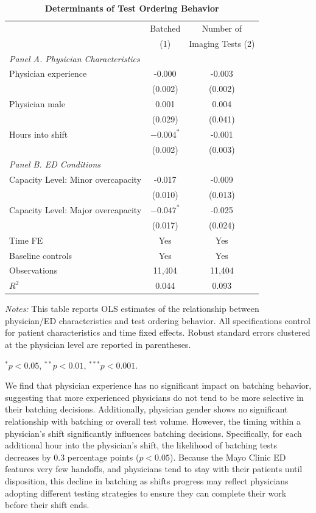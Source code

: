 \documentclass[,,nonblindrev]{informs}
\begin{document}
\begin{table}[t]
\centering
\caption{\textbf{Determinants of Test Ordering Behavior}}
\label{tab:determinants}
\begin{threeparttable}
\begin{tabular}{p{8cm}cc}
\toprule
& Batched & Number of \\
& (1) & Imaging Tests (2) \\
\midrule
\multicolumn{3}{l}{\textit{Panel A. Physician Characteristics}} \\[0.5em]
Physician experience & -0.000 & -0.003 \\
& (0.002) & (0.002) \\[0.5em]
Physician male & 0.001 & 0.004 \\
& (0.029) & (0.041) \\[0.5em]
Hours into shift & $-0.004^{*}$ & -0.001 \\
& (0.002) & (0.003) \\[0.5em]
\multicolumn{3}{l}{\textit{Panel B. ED Conditions}} \\[0.5em]
Capacity Level: Minor overcapacity & -0.017 & -0.009 \\
& (0.010) & (0.013) \\[0.5em]
Capacity Level: Major overcapacity & $-0.047^{*}$ & -0.025 \\
& (0.017) & (0.024) \\[0.5em]
\midrule
Time FE & Yes & Yes \\
Baseline controls & Yes & Yes \\
Observations & 11,404 & 11,404 \\
$R^2$ & 0.044 & 0.093 \\
\bottomrule
\end{tabular}
\begin{tablenotes}
\footnotesize
\item \textit{Notes:} This table reports OLS estimates of the relationship between physician/ED characteristics and test ordering behavior. All specifications control for patient characteristics and time fixed effects. Robust standard errors clustered at the physician level are reported in parentheses. 
\item $^{*} p<0.05$, $^{**} p<0.01$, $^{***} p<0.001$.
\end{tablenotes}
\end{threeparttable}
\end{table}

We find that physician experience has no significant impact on batching
behavior, suggesting that more experienced physicians do not tend to be
more selective in their batching decisions. Additionally, physician
gender shows no significant relationship with batching or overall test
volume. However, the timing within a physician's shift significantly
influences batching decisions. Specifically, for each additional hour
into the physician's shift, the likelihood of batching tests decreases
by 0.3 percentage points (\(p<0.05\)). Because the Mayo Clinic ED
features very few handoffs, and physicians tend to stay with their
patients until disposition, this decline in batching as shifts progress
may reflect physicians adopting different testing strategies to ensure
they can complete their work before their shift ends.
\end{document}
